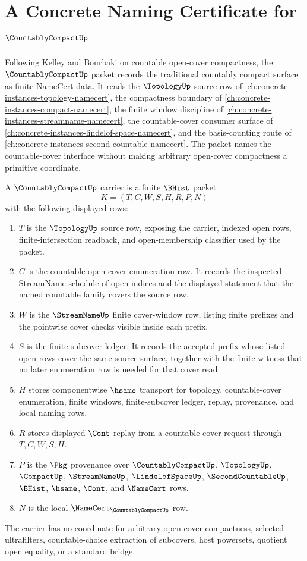 \chapter{A Concrete Naming Certificate for $\CountablyCompactUp$}
\label{ch:concrete-instances-countably-compact-namecert}

Following Kelley and Bourbaki on countable open-cover compactness, the $\CountablyCompactUp$ packet records the traditional countably compact surface as finite NameCert data. It reads the $\TopologyUp$ source row of \autoref{ch:concrete-instances-topology-namecert}, the compactness boundary of \autoref{ch:concrete-instances-compact-namecert}, the finite window discipline of \autoref{ch:concrete-instances-streamname-namecert}, the countable-cover consumer surface of \autoref{ch:concrete-instances-lindelof-space-namecert}, and the basis-counting route of \autoref{ch:concrete-instances-second-countable-namecert}. The packet names the countable-cover interface without making arbitrary open-cover compactness a primitive coordinate.

\begin{definition}
\label{def:countably-compact-carrier}
A $\CountablyCompactUp$ carrier is a finite $\BHist$ packet
$$
K=(T,C,W,S,H,R,P,N)
$$
with the following displayed rows:
\begin{enumerate}
\item $T$ is the $\TopologyUp$ source row, exposing the carrier, indexed open rows, finite-intersection readback, and open-membership classifier used by the packet.
\item $C$ is the countable open-cover enumeration row. It records the inspected StreamName schedule of open indices and the displayed statement that the named countable family covers the source row.
\item $W$ is the $\StreamNameUp$ finite cover-window row, listing finite prefixes and the pointwise cover checks visible inside each prefix.
\item $S$ is the finite-subcover ledger. It records the accepted prefix whose listed open rows cover the same source surface, together with the finite witness that no later enumeration row is needed for that cover read.
\item $H$ stores componentwise $\hsame$ transport for topology, countable-cover enumeration, finite windows, finite-subcover ledger, replay, provenance, and local naming rows.
\item $R$ stores displayed $\Cont$ replay from a countable-cover request through $T,C,W,S,H$.
\item $P$ is the $\Pkg$ provenance over $\CountablyCompactUp$, $\TopologyUp$, $\CompactUp$, $\StreamNameUp$, $\LindelofSpaceUp$, $\SecondCountableUp$, $\BHist$, $\hsame$, $\Cont$, and $\NameCert$ rows.
\item $N$ is the local $\NameCert_{\CountablyCompactUp}$ row.
\end{enumerate}
The carrier has no coordinate for arbitrary open-cover compactness, selected ultrafilters, countable-choice extraction of subcovers, host powersets, quotient open equality, or a standard bridge.
\end{definition}

